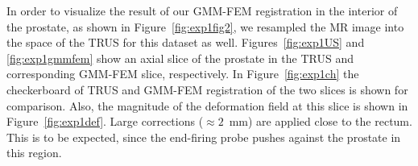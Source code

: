 \documentclass[journal]{IEEEtran}
\begin{document}
In order to visualize the result of our GMM-FEM registration in the interior of the prostate, as shown in Figure~\ref{fig:exp1fig2}, we resampled the MR image into the space of the TRUS for this dataset as well. Figures~\ref{fig:exp1US} and \ref{fig:exp1gmmfem} show an axial slice of the prostate in the TRUS and corresponding GMM-FEM slice, respectively. In Figure~\ref{fig:exp1ch} the checkerboard of TRUS and GMM-FEM registration of the two slices is shown for comparison. Also, the magnitude of the deformation field at this slice is shown in Figure~\ref{fig:exp1def}. Large corrections ($\approx2$~mm) are applied close to the rectum. This is to be expected, since the end-firing probe pushes against the prostate in this region.
\begin{figure}
	\centering
	\hfill
	\\
	\hfill

\end{figure}
\end{document}
